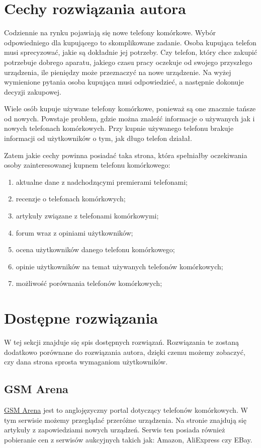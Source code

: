 \section{Cechy rozwiązania autora}
\label{ideal_solution}
Codziennie na rynku pojawiają się nowe telefony komórkowe. Wybór odpowiedniego dla kupującego to skomplikowane zadanie. Osoba kupująca telefon musi sprecyzować, jakie są dokładnie jej potrzeby. Czy telefon, który chce zakupić potrzebuje dobrego aparatu, jakiego czasu pracy oczekuje od swojego przyszłego urządzenia, ile pieniędzy może przeznaczyć na nowe urządzenie. Na wyżej wymienione pytania osoba kupująca musi odpowiedzieć, a następnie dokonuje decyzji zakupowej.

Wiele osób kupuje używane telefony komórkowe, ponieważ są one znacznie tańsze od nowych. Powstaje problem, gdzie można znaleźć informacje o używanych jak i nowych telefonach komórkowych. Przy kupnie używanego telefonu brakuje informacji od użytkowników o tym, jak długo telefon działał.  

Zatem jakie cechy powinna posiadać taka strona, która spełniałby oczekiwania osoby zainteresowanej kupnem telefonu komórkowego:
\begin{enumerate}
    \item aktualne dane z nadchodzącymi premierami telefonami;
    \item recenzje o telefonach komórkowych;
    \item artykuły związane z telefonami komórkowymi;
    \item forum wraz z opiniami użytkowników;
    \item ocena użytkowników danego telefonu komórkowego;
    \item opinie użytkowników na temat używanych telefonów komórkowych;
    \item możliwość porównania telefonów komórkowych;
\end{enumerate}

\section{Dostępne rozwiązania}
W tej sekcji znajduje się spis dostępnych rozwiązań. Rozwiązania te zostaną dodatkowo porównane do rozwiązania autora, dzięki czemu możemy zobaczyć, czy dana strona sprosta wymaganiom użytkowników.

\subsection{GSM Arena}
\href{https://www.gsmarena.com/}{GSM Arena} \cite{gsm_arena} jest to anglojęzyczny portal dotyczący telefonów komórkowych. W tym serwisie możemy przeglądać przeróżne urządzenia. Na stronie znajdują się artykuły z zapowiedziami nowych urządzeń. Serwis ten posiada również pobieranie cen z serwisów aukcyjnych takich jak: Amazon, AliExpress czy EBay.

